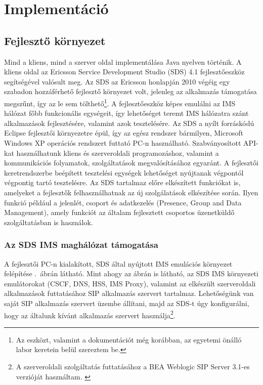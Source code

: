 \section{Implementáció}

\subsection{Fejlesztő környezet}

Mind a kliens, mind a szerver oldal implementálása Java nyelven történik. A kliens oldal az Ericsson Service Development Studio (SDS) 4.1 fejlesztőeszköz segítségével valósult meg. Az SDS az Ericsson honlapján 2010 végéig egy szabadon hozzáférhető fejlesztő környezet volt, jelenleg az alkalmazás támogatása megszűnt, így az le sem tölthető\footnote{Az eszközt, valamint a dokumentációt még korábban, az egyetemi önálló labor keretein belül szereztem be.}. A fejlesztőeszköz képes emulálni az IMS hálózat főbb funkcionális egységeit, így lehetőséget teremt IMS hálózatra szánt alkalmazások fejlesztésére, valamint azok tesztelésére. Az SDS a nyílt forráskódú Eclipse fejlesztői környezetre épül, így az egész rendszer bármilyen, Microsoft Windows XP operációs rendszert futtató PC-n használható. Szabványosított API-kat használhatunk kliens és szerveroldali programozáshoz, valamint a kommunikációs folyamatok, szolgáltatások megvalósításához egyaránt. A fejlesztői keretrendszerbe beépített tesztelési egységek lehetőséget nyújtanak végpontól végpontig tartó tesztelésre. Az SDS tartalmaz előre elkészített funkciókat is, amelyeket a fejlesztők felhasználhatnak az új szolgálatások elkészítése során. Ilyen funkció például a jelenlét, csoport és adatkezelés (Presence, Group and Data Management), amely funkciót az általam fejlesztett csoportos üzenetküldő szolgáltatásban is használok.

\subsubsection{Az SDS IMS maghálózat támogatása}

A fejlesztői PC-n kialakított, SDS által nyújtott IMS emulációs környezet felépítése .~ábrán  látható. Mint ahogy az ábrán is látható, az SDS IMS környezeti emulátorokat (CSCF, DNS, HSS, IMS Proxy), valamint az elkészült szerveroldali alkalmazások futtatásához SIP alkalmazás szervert tartalmaz. Lehetőségünk van saját SIP alkalmazás szervert üzembe állítani, majd az SDS-t úgy konfigurálni, hogy az általunk kívánt alkalmazás szervert használja\footnote{A szerveroldali szolgáltatás futtatásához a BEA Weblogic SIP Server 3.1-es verzióját használtam. \cite{bea_weblogic}}. 

